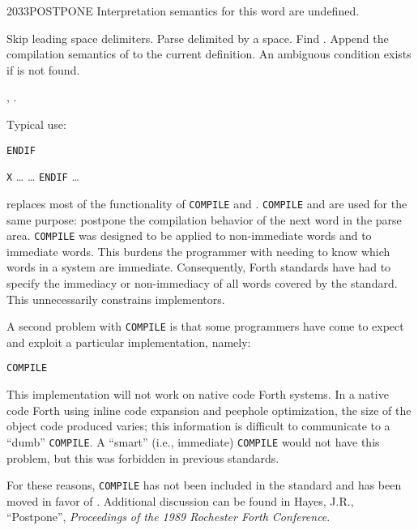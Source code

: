 \vspace*{-2ex}
\begin{worddef}{2033}{POSTPONE}
\interpret
	Interpretation semantics for this word are undefined.

\compile

	Skip leading space delimiters. Parse  delimited by
	a space. Find . Append the compilation semantics of
	 to the current definition. An ambiguous condition
	exists if  is not found.

\see {},
	.

	\begin{rationale} %
		Typical use:

		\tab \word{:} \texttt{ENDIF}
			 
		\word{;} 

		\tab \word{:} \texttt{X} {\ldots}
			 {\ldots} \texttt{ENDIF}
		{\ldots} \word{;}

		 replaces most of the functionality of
		\texttt{COMPILE} and  \word{[COMPILE]}. \texttt{COMPILE} and
	\linebreak
		\word{[COMPILE]} are used for the same purpose: postpone the
		compilation behavior of the next word in the parse area.
		\texttt{COMPILE} was designed to be applied to non-immediate
		words and \word{[COMPILE]} to immediate words. This burdens
		the programmer with needing to know which words in a system
		are immediate. Consequently, Forth standards have had to
		specify the immediacy or non-immediacy of all words covered by
		the standard. This unnecessarily constrains implementors.

		A second problem with \texttt{COMPILE} is that some
		programmers have come to expect and exploit a particular
		implementation, namely:

		\tab \word{:} \texttt{COMPILE} 
			  \word{,}  
		\word{;}

		This implementation will not work on native code Forth systems.
		In a native code Forth using inline code expansion and peephole
		optimization, the size of the object code produced varies; this
		information is difficult to communicate to a ``dumb''
		\texttt{COMPILE}. A ``smart'' (i.e., immediate) \texttt{COMPILE}
		would not have this problem, but this was forbidden in previous
		standards.

		For these reasons, \texttt{COMPILE} has not been included in
		the standard and \word{[COMPILE]} has been moved in favor of
		. Additional discussion can be found in Hayes,
		J.R., ``Postpone'', \emph{Proceedings of the 1989 Rochester
		Forth Conference}.
	\end{rationale}


\end{worddef}
